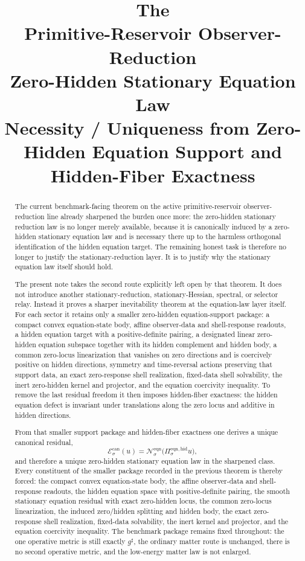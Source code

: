 \documentclass[11pt]{article}
\title{\textbf{The \TheoryName{}}\\[0.4em]
\large Primitive-Reservoir Observer-Reduction\\
\large Zero-Hidden Stationary Equation Law\\
\large Necessity / Uniqueness from Zero-Hidden Equation Support and Hidden-Fiber Exactness}
\author{}
\date{}
\newcommand{\CompletedMetric}{g^{\sharp}}
\newcommand{\EqnResidualCan}[1]{\mathcal E_{#1}^{\mathrm{can}}}
\newcommand{\EqnProj}[1]{\Pi_{#1}^{\mathrm{eqn,hid}}}
\newcommand{\EqnLin}[1]{\mathcal N_{#1}^{\mathrm{eqn}}}
\begin{document}
\maketitle

\begin{abstract}
The current benchmark-facing theorem on the active primitive-reservoir observer-reduction line already sharpened the burden once more: the zero-hidden stationary reduction law is no longer merely available, because it is canonically induced by a zero-hidden stationary equation law and is necessary there up to the harmless orthogonal identification of the hidden equation target. The remaining honest task is therefore no longer to justify the stationary-reduction layer. It is to justify why the stationary equation law itself should hold.

The present note takes the second route explicitly left open by that theorem. It does not introduce another stationary-reduction, stationary-Hessian, spectral, or selector relay. Instead it proves a sharper inevitability theorem at the equation-law layer itself. For each sector it retains only a smaller zero-hidden equation-support package: a compact convex equation-state body, affine observer-data and shell-response readouts, a hidden equation target with a positive-definite pairing, a designated linear zero-hidden equation subspace together with its hidden complement and hidden body, a common zero-locus linearization that vanishes on zero directions and is coercively positive on hidden directions, symmetry and time-reversal actions preserving that support data, an exact zero-response shell realization, fixed-data shell solvability, the inert zero-hidden kernel and projector, and the equation coercivity inequality. To remove the last residual freedom it then imposes hidden-fiber exactness: the hidden equation defect is invariant under translations along the zero locus and additive in hidden directions.

From that smaller support package and hidden-fiber exactness one derives a unique canonical residual,
\[
\EqnResidualCan{\sigma}(u)=\EqnLin{\sigma}\bigl(\EqnProj{\sigma}u\bigr),
\]
and therefore a unique zero-hidden stationary equation law in the sharpened class. Every constituent of the smaller package recorded in the previous theorem is thereby forced: the compact convex equation-state body, the affine observer-data and shell-response readouts, the hidden equation space with positive-definite pairing, the smooth stationary equation residual with exact zero-hidden locus, the common zero-locus linearization, the induced zero/hidden splitting and hidden body, the exact zero-response shell realization, fixed-data solvability, the inert kernel and projector, and the equation coercivity inequality. The benchmark package remains fixed throughout: the one operative metric is still exactly \(\CompletedMetric\), the ordinary matter route is unchanged, there is no second operative metric, and the low-energy matter law is not enlarged.
\end{abstract}
\end{document}
